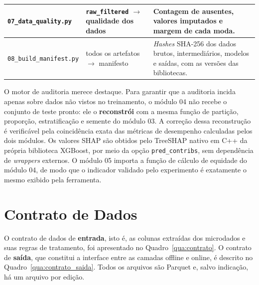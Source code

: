 \begin{quadro}[htbp]
\begin{tabular}{|>{\raggedright\arraybackslash}p{4.1cm}|>{\raggedright\arraybackslash}p{4.0cm}|>{\raggedright\arraybackslash}p{6.4cm}|}
\texttt{07\_data\_quality.py} & \texttt{raw\_filtered} $\rightarrow$ qualidade dos dados & Contagem de ausentes, valores imputados e margem de cada moda. \\ \hline
\texttt{08\_build\_manifest.py} & todos os artefatos $\rightarrow$ manifesto & \textit{Hashes} SHA-256 dos dados brutos, intermediários, modelos e saídas, com as versões das bibliotecas. \\ \hline
\end{tabular}
\end{quadro}

O motor de auditoria merece destaque. Para garantir que a auditoria incida apenas sobre dados não vistos no treinamento, o módulo 04 não recebe o conjunto de teste pronto: ele o \textbf{reconstrói} com a mesma função de partição, proporção, estratificação e semente do módulo 03. A correção dessa reconstrução é verificável pela coincidência exata das métricas de desempenho calculadas pelos dois módulos. Os valores SHAP são obtidos pelo TreeSHAP nativo em C++ da própria biblioteca XGBoost, por meio da opção \texttt{pred\_contribs}, sem dependência de \textit{wrappers} externos. O módulo 05 importa a função de cálculo de equidade do módulo 04, de modo que o indicador validado pelo experimento é exatamente o mesmo exibido pela ferramenta.

\section{Contrato de Dados}
\label{sec:contrato}

O contrato de dados de \textbf{entrada}, isto é, as colunas extraídas dos microdados e suas regras de tratamento, foi apresentado no Quadro~\ref{qua:contrato}. O contrato de \textbf{saída}, que constitui a interface entre as camadas offline e online, é descrito no Quadro~\ref{qua:contrato_saida}. Todos os arquivos são Parquet e, salvo indicação, há um arquivo por edição.

